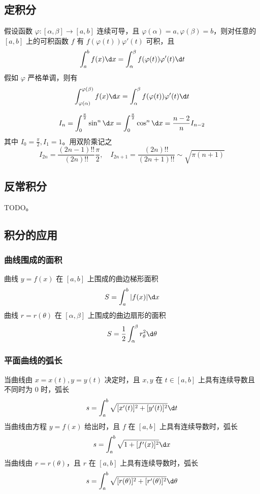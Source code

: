 \subsection{定积分}

\begin{theorem}
	假设函数 $\varphi : [\alpha, \beta] \to [a, b]$ 连续可导，且 $\varphi(\alpha) = a, \varphi(\beta) = b$，则对任意的 $[a, b]$ 上的可积函数 $f$ 有 $f(\varphi(t))\varphi'(t)$ 可积，且
	\[ \int_{a}^{b} f(x) \d x = \int_{\alpha}^{\beta} f(\varphi(t)) \varphi'(t) \d t \]
	假如 $\varphi$ 严格单调，则有
	\[ \int_{\varphi(\alpha)}^{\varphi(\beta)} f(x) \d x = \int_{\alpha}^{\beta} f(\varphi(t)) \varphi'(t) \d t \]

\end{theorem}

\begin{theorem}[Wallis 公式]
	\[ I_n = \int_{0}^{\frac{\pi}{2}} \sin^n \d x = \int_{0}^{\frac{\pi}{2}} \cos^n \d x = \frac{n-2}{n}I_{n-2} \]
	其中 $I_0 = \frac{\pi}{2}, I_1 = 1$。用双阶乘记之
	\[ I_{2n}=\frac{(2n-1)!!}{(2n)!!}\frac{\pi}{2}, \quad I_{2n+1}=\frac{(2n)!!}{(2n+1)!!} \sim \sqrt{\pi (n+1)} \]
\end{theorem}

\subsection{反常积分}

TODO。

\subsection{积分的应用}

\subsubsection*{曲线围成的面积}

曲线 $y = f(x)$ 在 $[a, b]$ 上围成的曲边梯形面积
\[ S = \int_{a}^{b} |f(x)| \d x \]
曲线 $r = r(\theta)$ 在 $[\alpha, \beta]$ 上围成的曲边扇形的面积
\[ S = \frac{1}{2} \int_{\alpha}^{\beta} r_{\theta}^2 \d \theta \]

\subsubsection*{平面曲线的弧长}

当曲线由 $x = x(t), y = y(t)$ 决定时，且 $x, y$ 在 $t \in [a, b]$ 上具有连续导数且不同时为 $0$ 时，弧长
\[ s = \int_{a}^{b} \sqrt{[x'(t)]^2 + [y'(t)]^2} \d t \]
当曲线由方程 $y = f(x)$ 给出时，且 $f$ 在 $[a, b]$ 上具有连续导数时，弧长
\[ s = \int_{a}^{b} \sqrt{1 + [f'(x)]^2} \d x \]
当曲线由 $r = r(\theta)$，且 $r$ 在 $[a, b]$ 上具有连续导数时，弧长
\[ s = \int_{a}^{b} \sqrt{[r(\theta)]^2 + [r'(\theta)]^2} \d \theta \]



